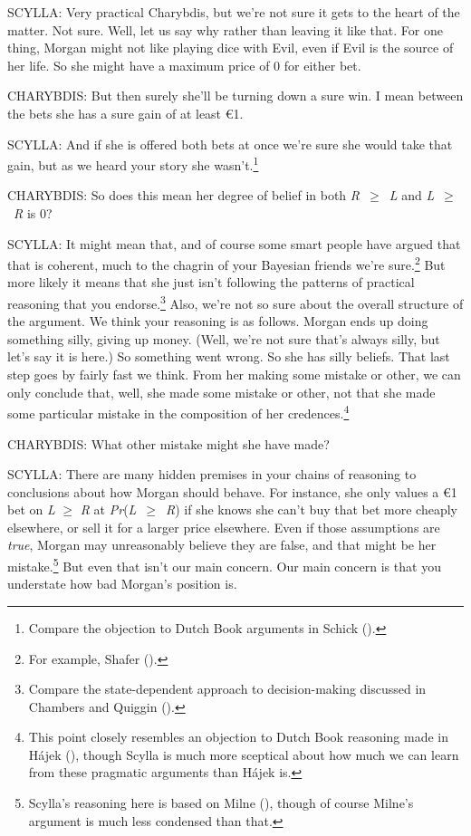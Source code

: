 \documentclass[
  10pt,
  letterpaper,
  DIV=11,
  numbers=noendperiod,
  twoside]{scrartcl}
\begin{document}
SCYLLA: Very practical Charybdis, but we're not sure it gets to the
heart of the matter. Not sure. Well, let us say why rather than leaving
it like that. For one thing, Morgan might not like playing dice with
Evil, even if Evil is the source of her life. So she might have a
maximum price of 0 for either bet.

CHARYBDIS: But then surely she'll be turning down a sure win. I mean
between the bets she has a sure gain of at least €1.

SCYLLA: And if she is offered both bets at once we're sure she would
take that gain, but as we heard your story she wasn't.\footnote{Compare
  the objection to Dutch Book arguments in Schick
  ().}

CHARYBDIS: So does this mean her degree of belief in both
\emph{R}~\({\geq}\)~\emph{L} and \emph{L}~\({\geq}\)~\emph{R} is 0?

SCYLLA: It might mean that, and of course some smart people have argued
that that is coherent, much to the chagrin of your Bayesian friends
we're sure.\footnote{For example, Shafer
  ().} But more likely it means that she
just isn't following the patterns of practical reasoning that you
endorse.\footnote{Compare the state-dependent approach to
  decision-making discussed in Chambers and Quiggin
  ().} Also, we're not so sure
about the overall structure of the argument. We think your reasoning is
as follows. Morgan ends up doing something silly, giving up money.
(Well, we're not sure that's always silly, but let's say it is here.) So
something went wrong. So she has silly beliefs. That last step goes by
fairly fast we think. From her making some mistake or other, we can only
conclude that, well, she made some mistake or other, not that she made
some particular mistake in the composition of her credences.\footnote{This
  point closely resembles an objection to Dutch Book reasoning made in
  Hájek (), though Scylla is much more
  sceptical about how much we can learn from these pragmatic arguments
  than Hájek is.}

CHARYBDIS: What other mistake might she have made?

SCYLLA: There are many hidden premises in your chains of reasoning to
conclusions about how Morgan should behave. For instance, she only
values a €1 bet on \emph{L} \({\geq}\) \emph{R} at
\emph{Pr}(\emph{L}~\({\geq}\)~\emph{R}) if she knows she can't buy that
bet more cheaply elsewhere, or sell it for a larger price elsewhere.
Even if those assumptions are \emph{true}, Morgan may unreasonably
believe they are false, and that might be her mistake.\footnote{Scylla's
  reasoning here is based on Milne (),
  though of course Milne's argument is much less condensed than that.}
But even that isn't our main concern. Our main concern is that you
understate how bad Morgan's position is.
\end{document}

